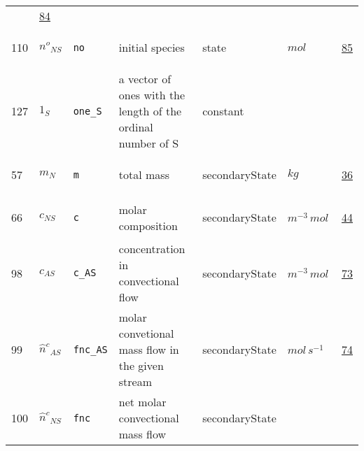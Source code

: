 \begin{longtable}{|p{1cm}|p{2.5cm}|p{4.5cm}|p{8cm}|p{3.0cm}|p{3cm}|p{1cm}|}
             & \hyperlink{"e:84"}{ 84 }
                 \\
    110
             & \hypertarget{"v:110"}{ $ {{n^o}}{_{{N S}}} $}
             & \verb|no|
             & initial species
             & \begin{lay}state \end{lay}
             & $ mol \, $
             & \hyperlink{"e:85"}{ 85 }
                 \\
    127
             & \hypertarget{"v:127"}{ $ {{1}}{_{S}} $}
             & \verb|one_S|
             & a vector of ones with the length of the ordinal number of S
             & \begin{lay}constant \end{lay}
             & $  $
             & \\
    57
             & \hypertarget{"v:57"}{ $ {m}{_{N}} $}
             & \verb|m|
             & total mass
             & \begin{lay}secondaryState \end{lay}
             & $ kg \, $
             & \hyperlink{"e:36"}{ 36 }
                 \\
    66
             & \hypertarget{"v:66"}{ $ {c}{_{{N S}}} $}
             & \verb|c|
             & molar composition
             & \begin{lay}secondaryState \end{lay}
             & $ m^{-3} \,mol \, $
             & \hyperlink{"e:44"}{ 44 }
                 \\
    98
             & \hypertarget{"v:98"}{ $ {c}{_{{A S}}} $}
             & \verb|c_AS|
             & concentration in convectional flow
             & \begin{lay}secondaryState \end{lay}
             & $ m^{-3} \,mol \, $
             & \hyperlink{"e:73"}{ 73 }
                 \\
    99
             & \hypertarget{"v:99"}{ $ {{\hat{n}^c}}{_{{A S}}} $}
             & \verb|fnc_AS|
             & molar convetional mass flow in the given stream
             & \begin{lay}secondaryState \end{lay}
             & $ mol \,s^{-1} \, $
             & \hyperlink{"e:74"}{ 74 }
                 \\
    100
             & \hypertarget{"v:100"}{ $ {{\hat{n}^c}}{_{{N S}}} $}
             & \verb|fnc|
             & net molar convectional mass flow
             & \begin{lay}secondaryState \end{lay}

\end{longtable}
